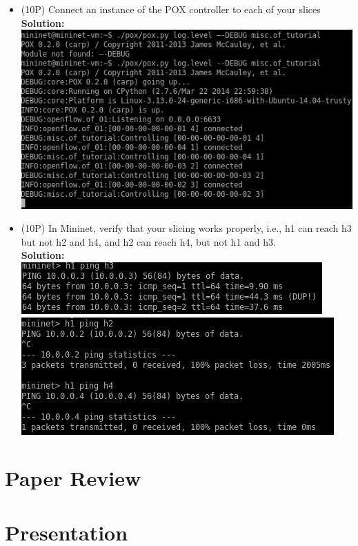 \documentclass{llncs}
\begin{document}
\begin{itemize}
\item (10P) Connect an instance of the POX controller to each of your slices 
\\
\textbf{Solution: }\\
\includegraphics[scale=0.815]{images/8-3.png} 
\item (10P) In Mininet, verify that your slicing works properly, i.e., h1 
can reach h3 but not h2 and h4, and h2 can reach h4, but not h1 and h3. \\
\textbf{Solution: } \\
\includegraphics[scale=1]{images/8-4.png}  \\
\includegraphics[scale=.9625]{images/8-5.png} 
\end{itemize}

%
\section{Paper Review}


%
\section{Presentation}

\end{document}
